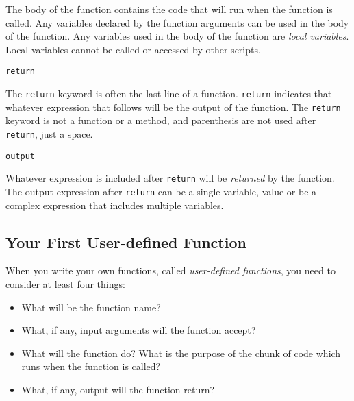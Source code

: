 \documentclass{book}
\providecommand{\tightlist}{%
      \setlength{\itemsep}{0pt}\setlength{\parskip}{0pt}}
\newcommand{\passthrough}[1]{#1}
\begin{document}
The body of the function contains the code that will run when the
function is called. Any variables declared by the function arguments can
be used in the body of the function. Any variables used in the body of
the function are \emph{local variables}. Local variables cannot be
called or accessed by other scripts.

\begin{lstlisting}
return
\end{lstlisting}

The \passthrough{\lstinline!return!} keyword is often the last line of a
function. \passthrough{\lstinline!return!} indicates that whatever
expression that follows will be the output of the function. The
\passthrough{\lstinline!return!} keyword is not a function or a method,
and parenthesis are not used after \passthrough{\lstinline!return!},
just a space.

\begin{lstlisting}
output
\end{lstlisting}

Whatever expression is included after \passthrough{\lstinline!return!}
will be \emph{returned} by the function. The output expression after
\passthrough{\lstinline!return!} can be a single variable, value or be a
complex expression that includes multiple variables.
    




    
        \hypertarget{your-first-user-defined-function}{%
\subsection{Your First User-defined
Function}\label{your-first-user-defined-function}}
    




    
        When you write your own functions, called \emph{user-defined functions},
you need to consider at least four things:

\begin{itemize}
\tightlist
\item
  What will be the function name?
\item
  What, if any, input arguments will the function accept?
\item
  What will the function do? What is the purpose of the chunk of code
  which runs when the function is called?
\item
  What, if any, output will the function return?
\end{itemize}
\end{document}

